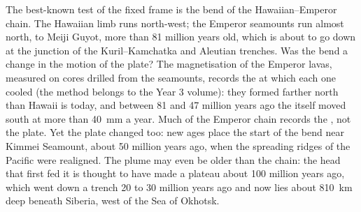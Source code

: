 The best-known test of the fixed frame is the bend of the Hawaiian--Emperor
chain. The Hawaiian limb runs north-west; the Emperor seamounts run almost
north, to Meiji Guyot, more than 81 million years old, which is about to go
down at the junction of the Kuril--Kamchatka and Aleutian trenches. Was the
bend a change in the motion of the plate? The magnetisation of the Emperor
lavas, measured on cores drilled from the seamounts, records the  at
which each one cooled (the method belongs to the Year 3 volume): they formed
farther north than Hawaii is today, and between 81 and 47 million years ago the
 itself moved south at more than \qty{40}{mm} a year. Much of the
Emperor chain records the , not the plate. Yet the plate changed too:
new ages place the start of the bend near Kimmei Seamount, about 50 million
years ago, when the spreading ridges of the Pacific were realigned. The plume
may even be older than the chain: the head that first fed it is thought to
have made a plateau about 100 million years ago, which went down a trench 20
to 30 million years ago and now lies about \qty{810}{km} deep beneath
Siberia, west of the Sea of Okhotsk.


